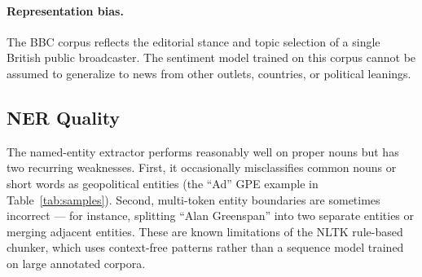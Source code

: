 \paragraph{Representation bias.} The BBC corpus reflects the editorial stance and topic selection of a single British public broadcaster. The sentiment model trained on this corpus cannot be assumed to generalize to news from other outlets, countries, or political leanings.

\subsection{NER Quality}

The named-entity extractor performs reasonably well on proper nouns but has two recurring weaknesses. First, it occasionally misclassifies common nouns or short words as geopolitical entities (the ``Ad'' GPE example in Table~\ref{tab:samples}). Second, multi-token entity boundaries are sometimes incorrect — for instance, splitting ``Alan Greenspan'' into two separate entities or merging adjacent entities. These are known limitations of the NLTK rule-based chunker, which uses context-free patterns rather than a sequence model trained on large annotated corpora.
